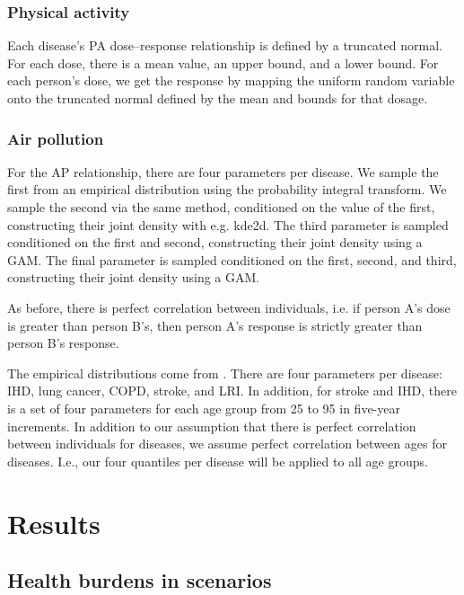 \documentclass{article}
\begin{document}
\subsubsection{Physical activity}

Each disease's PA dose--response relationship is defined by a truncated normal. For each dose, there is a mean value, an upper bound, and a lower bound. For each person's dose, we get the response by mapping the uniform random variable onto the truncated normal defined by the mean and bounds for that dosage.

\subsubsection{Air pollution}

For the AP relationship, there are four parameters per disease. We sample the first from an empirical distribution using the probability integral transform. We sample the second via the same method, conditioned on the value of the first, constructing their joint density with e.g. kde2d. The third parameter is sampled conditioned on the first and second, constructing their joint density using a GAM. The final parameter is sampled conditioned on the first, second, and third, constructing their joint density using a GAM.

As before, there is perfect correlation between individuals, i.e. if person A's dose is greater than person B's, then person A's response is strictly greater than person B's response.

The empirical distributions come from \citet{Burnett2014}. There are four parameters per disease: IHD, lung cancer, COPD, stroke, and LRI. In addition, for stroke and IHD, there is a set of four parameters for each age group from 25 to 95 in five-year increments. In addition to our assumption that there is perfect correlation between individuals for diseases, we assume perfect correlation between ages for diseases. I.e., our four quantiles per disease will be applied to all age groups. 
\clearpage
\section{Results}\label{results}
\subsection{Health burdens in scenarios}
\end{document}
